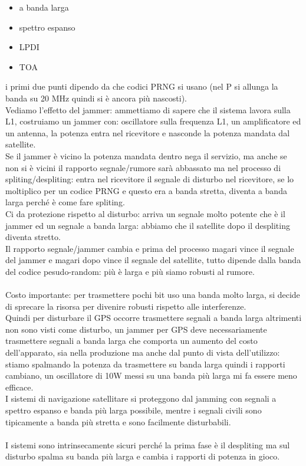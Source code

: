 \documentclass[oneside, 12pt]{extbook}
\begin{document}
\begin{itemize}
	\item a banda larga
	\item spettro espanso
	\item LPDI
	\item TOA
\end{itemize}
i primi due punti dipendo da che codici PRNG si usano (nel P si allunga la banda su 20 MHz quindi si è ancora più nascosti).\\
Vediamo l'effetto del jammer: ammettiamo di sapere che il sistema lavora sulla L1, costruiamo un jammer con: oscillatore sulla frequenza L1, un amplificatore ed un antenna, la potenza entra nel ricevitore e nasconde la potenza mandata dal satellite.\\
Se il jammer è vicino la potenza mandata dentro nega il servizio, ma anche se non si è vicini il rapporto segnale/rumore sarà abbassato ma nel processo di spliting/despliting: entra nel ricevitore il segnale di disturbo nel ricevitore, se lo moltiplico per un codice PRNG e questo era a banda stretta, diventa a banda larga perché è come fare spliting.\\
Ci da protezione rispetto al disturbo: arriva un segnale molto potente che è il jammer ed un segnale a banda larga: abbiamo che il satellite dopo il despliting diventa stretto.\\
Il rapporto segnale/jammer cambia e prima del processo magari vince il segnale del jammer e magari dopo vince il segnale del satellite, tutto dipende dalla banda del codice pesudo-random: più è larga e più siamo robusti al rumore.\\\\
Costo importante: per trasmettere pochi bit uso una banda molto larga, si decide di sprecare la risorsa per divenire robusti rispetto alle interferenze.\\
Quindi per disturbare il GPS occorre trasmettere segnali a banda larga altrimenti non sono visti come disturbo, un jammer per GPS deve necessariamente trasmettere segnali a banda larga che comporta un aumento del costo dell'apparato, sia nella produzione ma anche dal punto di vista dell'utilizzo: stiamo spalmando la potenza da trasmettere su banda larga quindi i rapporti cambiano, un oscillatore di 10W messi su una banda più larga mi fa essere meno efficace.\\
I sistemi di navigazione satellitare si proteggono dal jamming con segnali a spettro espanso e banda più larga possibile, mentre i segnali civili sono tipicamente a banda più stretta e sono facilmente disturbabili.\\\\
I sistemi sono intrinsecamente sicuri perché la prima fase è il despliting ma sul disturbo spalma su banda più larga e cambia i rapporti di potenza in gioco.
\end{document}
